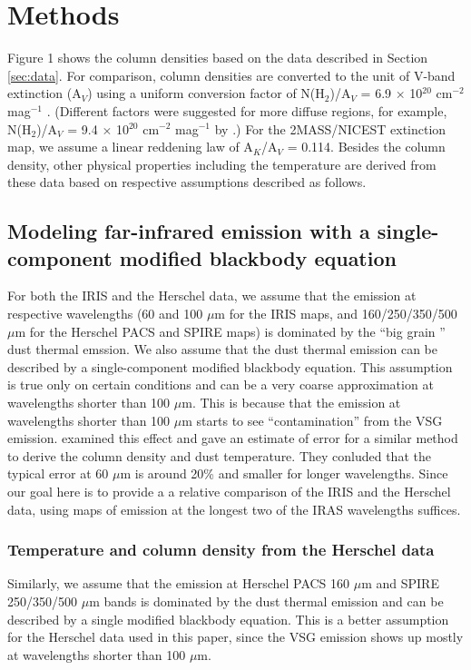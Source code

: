 \documentclass[11pt,a4paper]{emulateapj}
\begin{document}
\section{Methods}
\label{sec:methods}
Figure 1 shows the column densities based on the data described in Section \ref{sec:data}. For comparison, column densities are converted to the unit of V-band extinction (A$_V$) using a uniform conversion factor of N(H$_2$)/A$_V$ = 6.9 $\times$ 10$^{20}$ cm$^{-2}$ mag$^{-1}$ \citep{Draine_2003,Evans_2009}. (Different factors were suggested for more diffuse regions, for example, N(H$_2$)/A$_V$ = 9.4 $\times$ 10$^{20}$ cm$^{-2}$ mag$^{-1}$ by \citet{Bohlin_1978}.) For the 2MASS/NICEST extinction map, we assume a linear reddening law of A$_K$/A$_V$ = 0.114. Besides the column density, other physical properties including the temperature are derived from these data based on respective assumptions described as follows.

\subsection{Modeling far-infrared emission with a single-component modified blackbody equation}
For both the IRIS and the Herschel data, we assume that the emission at respective wavelengths (60 and 100 $\mu$m for the IRIS maps, and 160/250/350/500 $\mu$m for the Herschel PACS and SPIRE maps) is dominated by the ``big grain \citep[BG;]{Stepnik_2003}'' dust thermal emssion. We also assume that the dust thermal emission can be described by a single-component modified blackbody equation. This assumption is true only on certain conditions and can be a very coarse approximation at wavelengths shorter than 100 $\mu$m. This is because that the emission at wavelengths shorter than 100 $\mu$m starts to see ``contamination'' from the VSG emission. \citet{Schnee_2007} examined this effect and gave an estimate of error for a similar method to derive the column density and dust temperature. They conluded that the typical error at 60 $\mu$m is around 20\% and smaller for longer wavelengths. Since our goal here is to provide a a relative comparison of the IRIS and the Herschel data, using maps of emission at the longest two of the IRAS wavelengths suffices.


\subsubsection{Temperature and column density from the Herschel data}
Similarly, we assume that the emission at Herschel PACS 160 $\mu$m and SPIRE 250/350/500 $\mu$m bands is dominated by the dust thermal emission and can be described by a single modified blackbody equation. This is a better assumption for the Herschel data used in this paper, since the VSG emission shows up mostly at wavelengths shorter than 100 $\mu$m.
\end{document}
